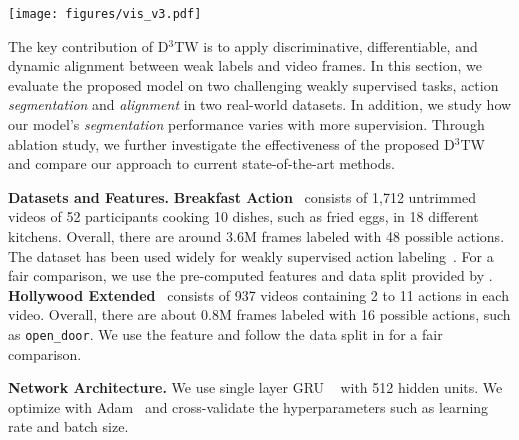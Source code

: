 \documentclass[10pt,twocolumn,letterpaper]{article}
\newcommand{\dttw}{D${}^3$TW\xspace}
\begin{document}
\begin{figure*}[tb]
\centering
   \texttt{[image: figures/vis\_v3.pdf]}
   \vspace{-4mm}
   \caption{
   Qualitative results on the Breakfast dataset.  Colors indicate  actions and the horizontal axis is time. 
   While both \emph{Ours w/o Discriminative} and \emph{NN-Viterbi} introduce additional actions not appearing in the ground truth, \emph{Ours w/o Discriminative} has better action boundaries because of the differentiable loss.
   \emph{Ours \dttw} is the only model that correctly captures all the occurring actions with discriminative modeling. In addition, this also leads to more accurate boundaries of actions.
   }
   \vspace{-1mm}
\label{fig:vis}
\end{figure*}

The key contribution of D${}^3$TW is to apply discriminative, differentiable, and dynamic alignment between weak labels and video frames. 
In this section, we evaluate the proposed model on two challenging weakly supervised tasks, action \textit{segmentation} and \textit{alignment} in two real-world datasets. In addition, we study how our model's \textit{segmentation} performance varies with more supervision. Through ablation study, we further investigate the effectiveness of the proposed \dttw and compare our approach to current state-of-the-art methods.



\vspace{1mm}
{\noindent \bf Datasets and Features.} {\bf Breakfast Action}~\cite{kuehne2014language} consists of 1,712 untrimmed videos of 52 participants cooking 10 dishes, such as fried eggs, in 18 different kitchens.  Overall, there are around 3.6M frames labeled with 48 possible actions. The dataset has been used widely for weakly supervised action labeling~\cite{ding2018weakly,huang2016connectionist,richard2017weakly,richard2018neuralnetwork}. For a fair comparison, we use the pre-computed features and data split provided by \cite{kuehne2014language}. {\bf Hollywood Extended}~\cite{bojanowski2014weakly} consists of 937 videos containing 2 to 11 actions in each video. Overall, there are about 0.8M frames labeled with 16 possible actions, such as \verb|open_door|. We use the feature and follow the data split in \cite{bojanowski2014weakly} for a fair comparison. 

\vspace{1mm}
{\noindent \bf Network Architecture.} We use single layer GRU ~\cite{graves2005framewise} with 512 hidden units. We optimize with Adam~\cite{kingma2014adam} and cross-validate the hyperparameters such as learning rate and batch size. 
\end{document}
